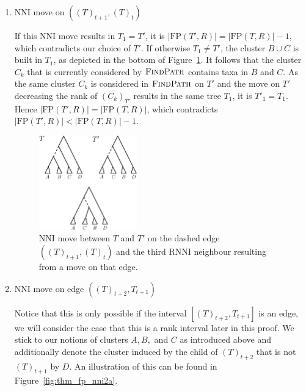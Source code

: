 \documentclass{amsart}
\newcommand{\rnni}{\mathrm{RNNI}}
\newcommand{\findpath}{\textsc{FindPath}}
\newcommand{\nni}{\mathrm{NNI}}
\newcommand{\fp}{\mathrm{FP}}
\begin{document}
\begin{enumerate}[{Case} (1).]
\item $\nni$ move on $((T)_{t+1},(T)_t)$

If this $\nni$ move results in $T_1 = T'$, it is $|\fp(T',R)| = |\fp(T,R)| - 1$, which contradicts our choice of $T'$.
If otherwise $T_1 \neq T'$, the cluster $B \cup C$ is built in $T_1$, as depicted in the bottom of Figure~\ref{fig:thm_fp_nni1}.
It follows that the cluster $C_k$ that is currently considered by $\findpath$ contains taxa in $B$ and $C$.
As the same cluster $C_k$ is considered in $\findpath$ on $T'$
 and the move on $T'$ decreasing the rank of $(C_k)_{T'}$ results in the same tree $T_1$, it is $T'_1 = T_1$.
Hence $|\fp(T',R)| = |\fp(T,R)|$, which contradicts $|\fp(T',R)| < |\fp(T,R)| - 1$.

\begin{figure}[!hbt]
\centering
\includegraphics[width=0.4\textwidth]{thm_fp_nni1}
\vspace{12pt}
\caption{$\nni$ move between $T$ and $T'$ on the dashed edge $((T)_{t+1},(T)_t)$ and the third $\rnni$ neighbour resulting from a move on that edge.}
\label{fig:thm_fp_nni1}
\end{figure}

\item $\nni$ move on edge $((T)_{t+2},T_{t+1})$

Notice that this is only possible if the interval $[(T)_{t+2},T_{t+1}]$ is an edge, we will consider the case that this is a rank interval later in this proof.
We stick to our notions of clusters $A,B,$ and $C$ as introduced above and additionally denote the cluster induced by the child of $(T)_{t+2}$ that is not $(T)_{t+1}$ by $D$.
An illustration of this can be found in Figure~\ref{fig:thm_fp_nni2a}.


\end{enumerate}
\end{document}
